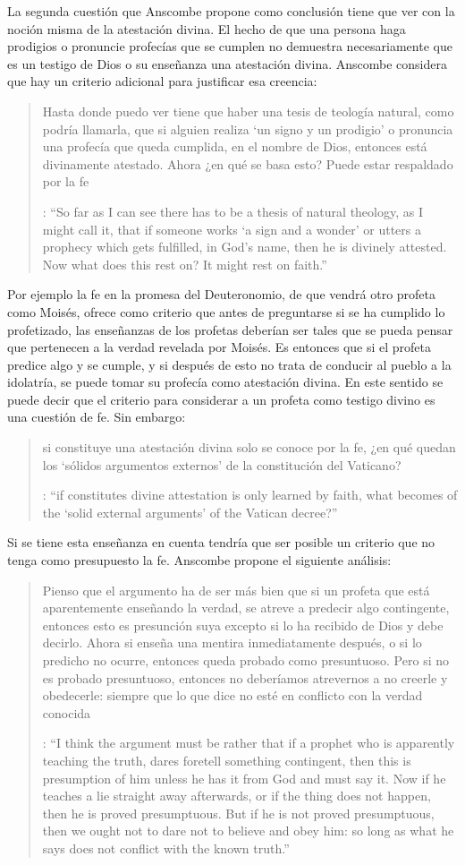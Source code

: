 La segunda cuestión que Anscombe propone como conclusión tiene que ver con la noción misma de la atestación divina. El hecho de que una persona haga prodigios o pronuncie profecías que se cumplen no demuestra necesariamente que es un testigo de Dios o su enseñanza una atestación divina. Anscombe considera que hay un criterio adicional para justificar esa creencia: \blockquote[{\cite[38]{anscombe2008faith:prophandmi}}: \enquote{So far as I can see there has to be a thesis of natural theology, as I might call it, that if someone works `a sign and a wonder' or utters a prophecy which gets fulfilled, in God's name, then he is divinely attested. Now what does this rest on? It might rest on faith.}]{Hasta donde puedo ver tiene que haber una tesis de teología natural, como podría llamarla, que si alguien realiza `un signo y un prodigio' o pronuncia una profecía que queda cumplida, en el nombre de Dios, entonces está divinamente atestado. Ahora ¿en qué se basa esto? Puede estar respaldado por la fe}. Por ejemplo la fe en la promesa del Deuteronomio, de que vendrá otro profeta como Moisés, ofrece como criterio que antes de preguntarse si se ha cumplido lo profetizado, las enseñanzas de los profetas deberían ser tales que se pueda pensar que pertenecen a la verdad revelada por Moisés. Es entonces que si el profeta predice algo y se cumple, y si después de esto no trata de conducir al pueblo a la idolatría, se puede tomar su profecía como atestación divina. En este sentido se puede decir que el criterio para considerar a un profeta como testigo divino es una cuestión de fe. Sin embargo: \blockquote[{\cite[38]{anscombe2008faith:prophandmi}}: \enquote{if  constitutes divine attestation is only learned by faith, what becomes of the `solid external arguments' of the Vatican decree?}]{si  constituye una atestación divina solo se conoce por la fe, ¿en qué quedan los `sólidos argumentos externos' de la constitución del Vaticano?}. Si se tiene esta enseñanza en cuenta tendría que ser posible un criterio que no tenga como presupuesto la fe. Anscombe propone el siguiente análisis: \blockquote[{\cite[38]{anscombe2008faith:prophandmi}}: \enquote{I think the argument must be rather that if a prophet who is apparently teaching the truth, dares foretell something contingent, then this is presumption of him unless he has it from God and must say it. Now if he teaches a lie straight away afterwards, or if the thing does not happen, then he is proved presumptuous. But if he is not proved presumptuous, then we ought not to dare not to believe and obey him: so long as what he says does not conflict with the known truth.}]{Pienso que el argumento ha de ser más bien que si un profeta que está aparentemente enseñando la verdad, se atreve a predecir algo contingente, entonces esto es presunción suya excepto si lo ha recibido de Dios y debe decirlo. Ahora si enseña una mentira inmediatamente después, o si lo predicho no ocurre, entonces queda probado como presuntuoso. Pero si no es probado presuntuoso, entonces no deberíamos atrevernos a no creerle y obedecerle: siempre que lo que dice no esté en conflicto con la verdad conocida}.\label{subsec:argprof}

